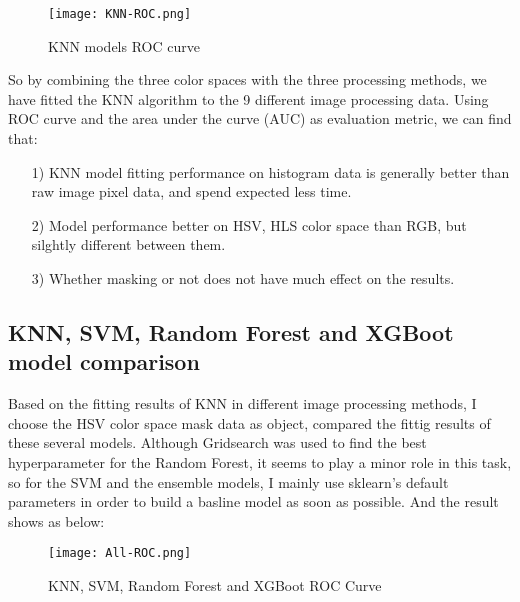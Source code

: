\documentclass[12pt]{article}
\begin{document}
\begin{table}[htb]
\centering
{}
\caption{KNN model comparison}
\end{table}

\begin{center}
\begin{figure}[htb]
\centering 
\texttt{[image: KNN-ROC.png]}
\caption{KNN models ROC curve}
\end{figure}
\end{center} 
So by combining the three color spaces with the three processing methods, we have fitted the KNN algorithm to the 9 different image processing data. Using ROC curve and the area under the curve (AUC) as evaluation metric, we can find that:
\begin{itemize}
\item[1)] KNN model fitting performance on histogram data is generally better than raw image pixel data, and spend expected less time.
\item[2)] Model performance better on HSV, HLS color space than RGB, but silghtly different between them.
\item[3)] Whether masking or not does not have much effect on the results.
\end{itemize}

    
\subsection{KNN, SVM, Random Forest and XGBoot model comparison}
Based on the fitting results of KNN in different image processing methods, I choose the HSV color space mask data as object, compared the fittig results of these several models. Although Gridsearch was used to find the best hyperparameter for the Random Forest, it seems to play a minor role in this task, so for the SVM and the ensemble models, I mainly use sklearn's default parameters in order to build a basline model as soon as possible. And the result shows as below:
\begin{center}
\begin{figure}[htb]
\centering 
\texttt{[image: All-ROC.png]}
\caption{KNN, SVM, Random Forest and XGBoot ROC Curve}
\end{figure}
\end{center}
\end{document}
